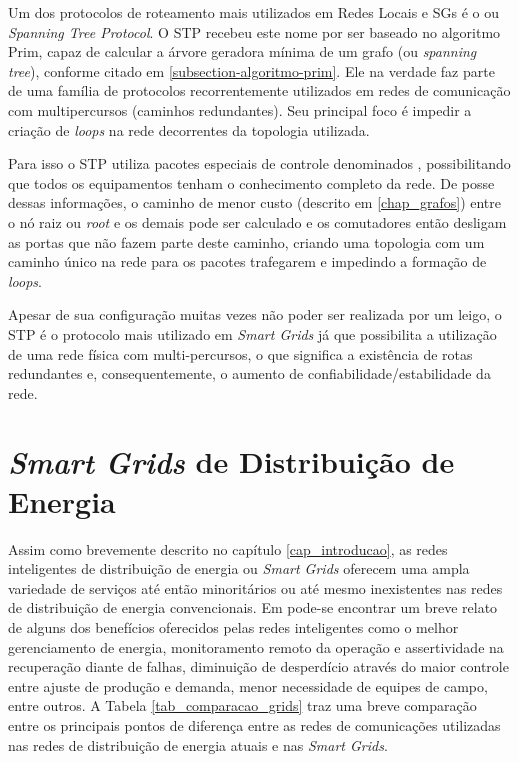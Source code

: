Um dos protocolos de roteamento mais utilizados em Redes Locais e SGs é o  ou \emph{Spanning Tree Protocol}. O STP recebeu este nome por ser baseado no algoritmo Prim, capaz de calcular a árvore geradora mínima de um grafo (ou \emph{spanning tree}), conforme citado em \ref{subsection-algoritmo-prim}. Ele na verdade faz parte de uma família de protocolos recorrentemente utilizados em redes de comunicação com multipercursos (caminhos redundantes). Seu principal foco é impedir a criação de \emph{loops} na rede decorrentes da topologia utilizada.

Para isso o STP utiliza pacotes especiais de controle denominados , possibilitando que todos os equipamentos tenham o conhecimento completo da rede. De posse dessas informações, o caminho de menor custo (descrito em \ref{chap_grafos}) entre o nó raiz ou \emph{root} e os demais pode ser calculado e os comutadores então desligam as portas que não fazem parte deste caminho, criando uma topologia com um caminho único na rede para os pacotes trafegarem e impedindo a formação de \emph{loops}.


Apesar de sua configuração muitas vezes não poder ser realizada por um leigo, o STP é o protocolo mais utilizado em \emph{Smart Grids} já que possibilita a utilização de uma rede física com multi-percursos, o que significa a existência de rotas redundantes e, consequentemente, o aumento de confiabilidade/estabilidade da rede.

\section{\emph{Smart Grids} de Distribuição de Energia}
Assim como brevemente descrito no capítulo \ref{cap_introducao}, as redes inteligentes de distribuição de energia ou \emph{Smart Grids} oferecem uma ampla variedade de serviços até então minoritários ou até mesmo inexistentes nas redes de distribuição de energia convencionais. Em \cite{Art-Ma2013} pode-se encontrar um breve relato de alguns dos benefícios oferecidos pelas redes inteligentes como o melhor gerenciamento de energia, monitoramento remoto da operação e assertividade na recuperação diante de falhas, diminuição de desperdício através do maior controle entre ajuste de produção e demanda, menor necessidade de equipes de campo, entre outros. A Tabela \ref{tab_comparacao_grids} traz uma breve comparação entre os principais pontos de diferença entre as redes de comunicações utilizadas nas redes de distribuição de energia atuais e nas \emph{Smart Grids}.

